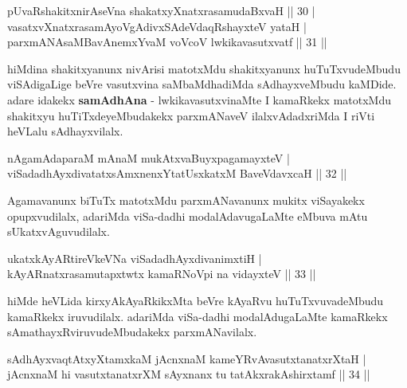 
\begin{shl}
pUvaRshakitxnirAseVna shakatxyXnatxrasamudaBxvaH \hfill || 30 |\\
vasatxvXnatxrasamAyoVgAdivxSAdeVdaqRshayxteV yataH |\\
parxmANAsaMBavAnemxYvaM voVcoV lwkikavasutxvatf \hfill || 31 ||
\end{shl}

\begin{artha}
hiMdina shakitxyanunx nivArisi matotxMdu shakitxyanunx huTuTxvudeMbudu viSAdigaLige beVre vasutxvina saMbaMdhadiMda sAdhayxveMbudu kaMDide. adare idakekx \textbf{samAdhAna} - lwkikavasutxvinaMte I kamaRkekx matotxMdu shakitxyu huTiTxdeyeMbudakekx parxmANaveV ilalxvAdadxriMda I riVti heVLalu sAdhayxvilalx.
\end{artha}


\begin{shl}
nA\s \s gamAdaparaM mAnaM mukAtxvaBuyxpagamayxteV |\\
viSadadhAyxdivatatxsAmxnenxYtatUsxkatxM BaveVdavxcaH \hfill || 32 ||
\end{shl}

\begin{artha}
Agamavanunx biTuTx matotxMdu parxmANavanunx mukitx viSayakekx opupxvudilalx, adariMda 
viSa-dadhi modalAdavugaLaMte eMbuva mAtu sUkatxvAguvudilalx.
\end{artha}


\begin{shl}
ukatxkAyARtireVkeVNa viSadadhAyxdivanimxtiH |\\
kAyARnatxrasamutapxtwtx kamaRNoV\s pi na vidayxteV \hfill || 33 ||
\end{shl}

\begin{artha}
hiMde heVLida kirxyAkAyaRkikxMta beVre kAyaRvu huTuTxvuvadeMbudu kamaRkekx iruvudilalx. adariMda viSa-dadhi modalAdugaLaMte kamaRkekx sAmathayxRviruvudeMbudakekx parxmANavilalx.
\end{artha}


\begin{shl}
sAdhAyxvaqtAtxyXtamxkaM jAcnxnaM kameYRvAvasutxtanatxrXtaH |\\
jAcnxnaM hi vasutxtanatxrXM sAyxnanx tu tatAkxrakAshirxtamf \hfill || 34 ||
\end{shl}


